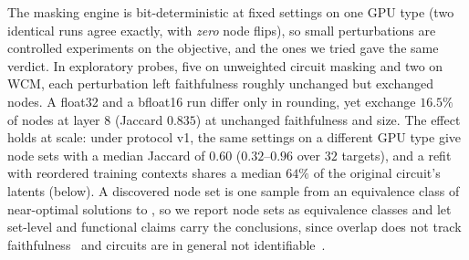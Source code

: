 \documentclass[10pt]{article}
\begin{document}
The masking engine is bit-deterministic at fixed settings on one GPU type (two identical runs agree exactly, with \emph{zero} node flips), so small perturbations are controlled experiments on the objective, and the ones we tried gave the same verdict.
In exploratory probes, five on unweighted circuit masking and two on WCM, each perturbation left faithfulness roughly unchanged but exchanged nodes.
A float32 and a bfloat16 run differ only in rounding, yet exchange $16.5\%$ of nodes at layer 8 (Jaccard $0.835$) at unchanged faithfulness and size.
The effect holds at scale: under protocol v1, the same settings on a different GPU type give node sets with a median Jaccard of $0.60$ ($0.32$--$0.96$ over $32$ targets), and a refit with reordered training contexts shares a median $64\%$ of the original circuit's latents (below).
A discovered node set is one sample from an equivalence class of near-optimal solutions to , so we report node sets as equivalence classes and let set-level and functional claims carry the conclusions, since overlap does not track faithfulness~\citep{hanna2024faith} and circuits are in general not identifiable~\citep{meloux2025everything, meloux2025dead}.
\end{document}
